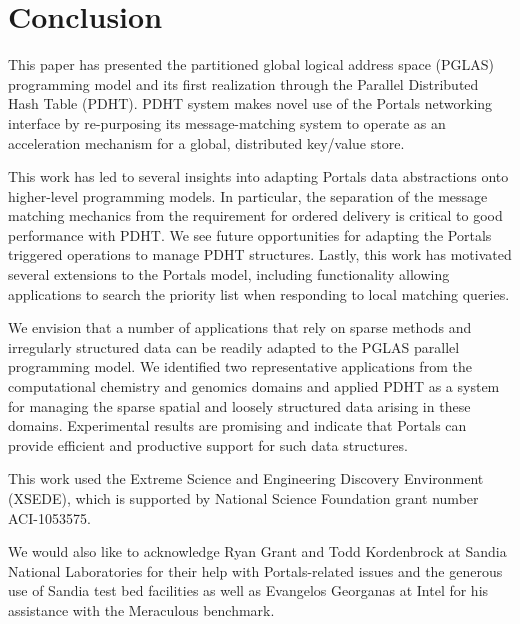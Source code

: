 \section{Conclusion}

This paper has presented the partitioned global logical address space (PGLAS)
programming model and its first realization through the Parallel Distributed
Hash Table (PDHT).  PDHT system makes novel use of the Portals networking
interface by re-purposing its message-matching system to operate as an
acceleration mechanism for a global, distributed key/value store.

This work has led to several insights into adapting Portals data abstractions
onto higher-level programming models. In particular, the separation of the
message matching mechanics from the requirement for ordered delivery is
critical to good performance with PDHT. We see future opportunities for
adapting the Portals triggered operations to manage PDHT structures. Lastly,
this work has motivated several extensions to the Portals model, including
functionality allowing applications to search the priority list when responding
to local matching queries.

We envision that a number of applications that rely on sparse methods and
irregularly structured data can be readily adapted to the PGLAS parallel
programming model.  We identified two representative applications from the
computational chemistry and genomics domains and applied PDHT as a system for
managing the sparse spatial and loosely structured data arising in these
domains.  Experimental results are promising and indicate that Portals can
provide efficient and productive support for such data structures.

\begin{acks}
This work used the Extreme Science and Engineering Discovery Environment
(XSEDE), which is supported by National Science Foundation grant number
ACI-1053575.

We would also like to acknowledge Ryan Grant and Todd Kordenbrock at Sandia
National Laboratories for their help with Portals-related issues and the
generous use of Sandia test bed facilities as well as Evangelos Georganas at
Intel for his assistance with the Meraculous benchmark.
\end{acks}

